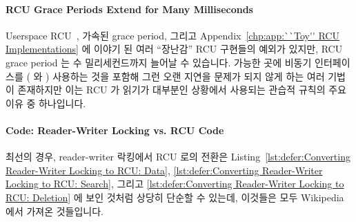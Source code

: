 \paragraph{RCU Grace Periods Extend for Many Milliseconds}

Userspace RCU~\cite{MathieuDesnoyers2009URCU,PaulMcKenney2013LWNURCU}, 가속된
grace period, 그리고
Appendix~\ref{chp:app:``Toy'' RCU Implementations} 에 이야기 된 여러 ``장난감''
RCU 구현들의 예외가 있지만, RCU grace period 는 수 밀리세컨드까지 늘어날 수
있습니다.
가능한 곳에 비동기 인터페이스를 ( 와 )
사용하는 것을 포함해 그런 오랜 지연을 문제가 되지 않게 하는 여러 기법이
존재하지만 이는 RCU 가 읽기가 대부분인 상황에서 사용되는 관습적 규칙의 주요
이유 중 하나입니다.

\paragraph{Code: Reader-Writer Locking vs. RCU Code}

최선의 경우, reader-writer 락킹에서 RCU 로의 전환은
Listing~\ref{lst:defer:Converting Reader-Writer Locking to RCU: Data},
\ref{lst:defer:Converting Reader-Writer Locking to RCU: Search},
그리고
\ref{lst:defer:Converting Reader-Writer Locking to RCU: Deletion}
에 보인 것처럼 상당히 단순할 수 있는데, 이것들은 모두
Wikipedia~\cite{WikipediaRCU} 에서 가져온 것들입니다.

